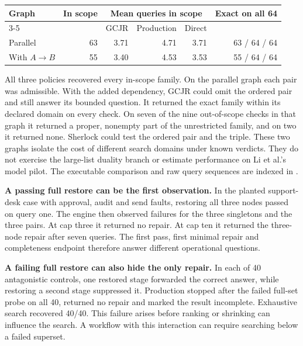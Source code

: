 \documentclass[11pt,letterpaper]{article}
\begin{document}
\begin{center}\begin{minipage}{\linewidth}\centering
{}\label{tab:shared}
\small\begin{tabular}{@{}lrrrrr@{}}\toprule
Graph & In scope & \multicolumn{3}{c}{Mean queries in scope} & Exact on all 64\\
\cmidrule(lr){3-5}
 & & GCJR & Production & Direct & \\\midrule
Parallel & 63 & 3.71 & 4.71 & 3.71 & 63 / 64 / 64\\
With $A\to B$ & 55 & 3.40 & 4.53 & 3.53 & 55 / 64 / 64\\
\bottomrule\end{tabular}\end{minipage}\end{center}

All three policies recovered every in-scope family. On the parallel graph each pair was admissible. With the added dependency, GCJR could omit the ordered pair and still answer its bounded question. It returned the exact family within its declared domain on every check. On seven of the nine out-of-scope checks in that graph it returned a proper, nonempty part of the unrestricted family, and on two it returned none. Sherlock could test the ordered pair and the triple. These two graphs isolate the cost of different search domains under known verdicts. They do not exercise the large-list duality branch or estimate performance on Li et al.'s model pilot. The executable comparison and raw query sequences are indexed in .

\textbf{A passing full restore can be the first observation.} In the planted support-desk case with approval, audit and send faults, restoring all three nodes passed on query one. The engine then observed failures for the three singletons and the three pairs. At cap three it returned no repair. At cap ten it returned the three-node repair after seven queries. The first pass, first minimal repair and completeness endpoint therefore answer different operational questions.

\textbf{A failing full restore can also hide the only repair.} In each of 40 antagonistic controls, one restored stage forwarded the correct answer, while restoring a second stage suppressed it. Production stopped after the failed full-set probe on all 40, returned no repair and marked the result incomplete. Exhaustive search recovered 40/40. This failure arises before ranking or shrinking can influence the search. A workflow with this interaction can require searching below a failed superset.
\end{document}
